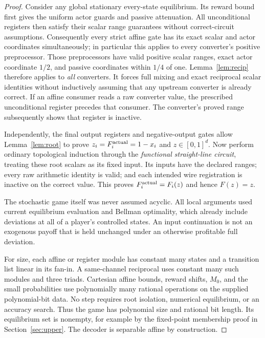 \documentclass[11pt,a4paper]{article}
\numberwithin{equation}{section}
\theoremstyle{definition}
\begin{document}
\begin{proof}
Consider any global stationary every-state equilibrium. Its reward
bound first gives the uniform actor guards and passive attenuation.
All unconditional registers then satisfy their scalar range guarantees
without correct-circuit assumptions. Consequently every strict affine
gate has its exact scalar and actor coordinates simultaneously; in
particular this applies to every converter's positive preprocessor.
Those preprocessors have valid positive scalar ranges, exact actor
coordinate \(1/2\), and passive coordinates within \(1/4\) of one.
Lemma~\ref{lem:recip} therefore applies to \emph{all} converters.
It forces full mixing and exact reciprocal scalar identities without
inductively assuming that any upstream converter is already correct.
If an affine consumer reads a raw converter value, the prescribed
unconditional register precedes that consumer. The converter's proved
range subsequently shows that register is inactive.

Independently, the final output registers and negative-output gates
allow Lemma~\ref{lem:root} to prove \(z_i=F_i^{\rm actual}=1-x_i\)
and \(z\in[0,1]^d\). Now perform ordinary topological induction through
the \emph{functional straight-line circuit}, treating these root
scalars as its fixed input. Its inputs have the declared ranges; every
raw arithmetic identity is valid; and each intended wire registration
is inactive on the correct value. This proves
\(F_i^{\rm actual}=F_i(z)\) and hence \(F(z)=z\).

The stochastic game itself was never assumed acyclic. All local
arguments used current equilibrium evaluation and Bellman optimality,
which already include deviations at all of a player's controlled
states. An input continuation is not an exogenous payoff that is held
unchanged under an otherwise profitable full deviation.

For size, each affine or register module has constant many states and
a transition list linear in its fan-in. A same-channel reciprocal uses
constant many such modules and three triads. Cartesian affine bounds,
reward shifts, \(M_0\), and the small probabilities use polynomially
many rational operations on the supplied polynomial-bit data. No step
requires root isolation, numerical equilibrium, or an accuracy search.
Thus the game has polynomial size and rational bit length. Its
equilibrium set is nonempty, for example by the fixed-point membership
proof in Section~\ref{sec:upper}. The decoder is separable affine by
construction.
\end{proof}
\end{document}
